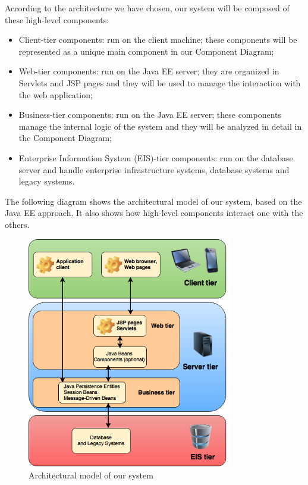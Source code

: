 According to the architecture we have chosen, our system will be composed of these high-level components:
\begin{itemize}
    \item Client-tier components: run on the client machine; these components will be represented as a unique main component in our Component Diagram;
    \item Web-tier components: run on the Java EE server; they are organized in Servlets and JSP pages and they will be used to manage the interaction with the web application;
    \item Business-tier components: run on the Java EE server; these components manage the internal logic of the system and they will be analyzed in detail in the Component Diagram;
    \item Enterprise Information System (EIS)-tier components: run on the database server and handle enterprise infrastructure systems, database systems and legacy systems.
\end{itemize}

The following diagram shows the architectural model of our system, based on the Java EE approach. It also shows how high-level components interact one with the others.

    \begin{figure}[H]
        \centering
        \includegraphics[width=9cm]{./Images/ArchitecturalModel.png}
        \caption{Architectural model of our system}
        \label{architectural-model}
    \end{figure}

